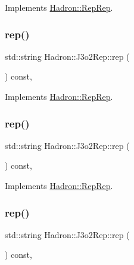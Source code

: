 Implements \mbox{\hyperlink{structHadron_1_1RepRep_ab3213025f6de249f7095892109575fde}{Hadron\+::\+Rep\+Rep}}.

\mbox{\label{structHadron_1_1J3o2Rep_a4284616b9bdc9582f085ab1b60a15f1d}} 
\subsubsection{\texorpdfstring{rep()}{rep()}\hspace{0.1cm}{\footnotesize\ttfamily [2/5]}}
{\footnotesize\ttfamily std\+::string Hadron\+::\+J3o2\+Rep\+::rep (\begin{DoxyParamCaption}{ }\end{DoxyParamCaption}) const\hspace{0.3cm}{\ttfamily [inline]}, {\ttfamily [virtual]}}



Implements \mbox{\hyperlink{structHadron_1_1RepRep_ab3213025f6de249f7095892109575fde}{Hadron\+::\+Rep\+Rep}}.

\mbox{\label{structHadron_1_1J3o2Rep_a4284616b9bdc9582f085ab1b60a15f1d}} 
\subsubsection{\texorpdfstring{rep()}{rep()}\hspace{0.1cm}{\footnotesize\ttfamily [3/5]}}
{\footnotesize\ttfamily std\+::string Hadron\+::\+J3o2\+Rep\+::rep (\begin{DoxyParamCaption}{ }\end{DoxyParamCaption}) const\hspace{0.3cm}{\ttfamily [inline]}, {\ttfamily [virtual]}}



Implements \mbox{\hyperlink{structHadron_1_1RepRep_ab3213025f6de249f7095892109575fde}{Hadron\+::\+Rep\+Rep}}.

\mbox{\label{structHadron_1_1J3o2Rep_a4284616b9bdc9582f085ab1b60a15f1d}} 
\subsubsection{\texorpdfstring{rep()}{rep()}\hspace{0.1cm}{\footnotesize\ttfamily [4/5]}}
{\footnotesize\ttfamily std\+::string Hadron\+::\+J3o2\+Rep\+::rep (\begin{DoxyParamCaption}{ }\end{DoxyParamCaption}) const\hspace{0.3cm}{\ttfamily [inline]}, {\ttfamily [virtual]}}



